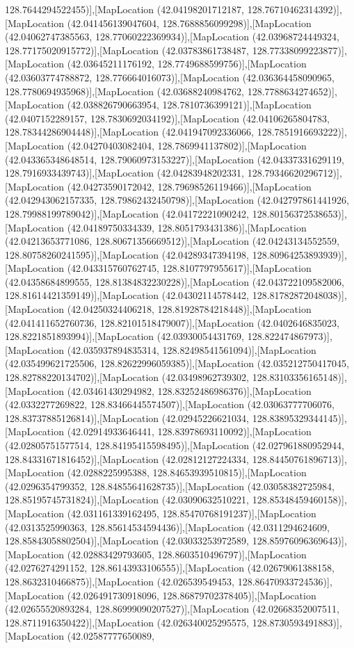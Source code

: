 128.7644294522455)],[MapLocation (42.04198201712187, 128.76710462314392)],[MapLocation (42.041456139047604, 128.7688856099298)],[MapLocation (42.04062747385563, 128.77060222369934)],[MapLocation (42.03968724449324, 128.77175020915772)],[MapLocation (42.03783861738487, 128.77338099223877)],[MapLocation (42.03645211176192, 128.7749688599756)],[MapLocation (42.03603774788872, 128.776664016073)],[MapLocation (42.036364458090965, 128.7780694935968)],[MapLocation (42.03688240984762, 128.7788634274652)],[MapLocation (42.038826790663954, 128.7810736399121)],[MapLocation (42.0407152289157, 128.7830692034192)],[MapLocation (42.04106265804783, 128.78344286904448)],[MapLocation (42.041947092336066, 128.7851916693222)],[MapLocation (42.04270403082404, 128.7869941137802)],[MapLocation (42.043365348648514, 128.79060973153227)],[MapLocation (42.04337331629119, 128.7916933439743)],[MapLocation (42.04283948202331, 128.79346620296712)],[MapLocation (42.04273590172042, 128.79698526119466)],[MapLocation (42.042943062157335, 128.79862432450798)],[MapLocation (42.042797861441926, 128.79988199789042)],[MapLocation (42.04172221090242, 128.80156372538653)],[MapLocation (42.04189750334339, 128.8051793431386)],[MapLocation (42.04213653771086, 128.80671356669512)],[MapLocation (42.04243134552559, 128.80758260241595)],[MapLocation (42.04289347394198, 128.80964253893939)],[MapLocation (42.043315760762745, 128.8107797955617)],[MapLocation (42.04358684899555, 128.81384832230228)],[MapLocation (42.043722109582006, 128.81614421359149)],[MapLocation (42.04302114578442, 128.81782872048038)],[MapLocation (42.04250324406218, 128.81928784218448)],[MapLocation (42.041411652760736, 128.82101518479007)],[MapLocation (42.0402646835023, 128.8221851893994)],[MapLocation (42.03930054431769, 128.822474867973)],[MapLocation (42.035937894835314, 128.82498541561094)],[MapLocation (42.035499621725506, 128.82622996059385)],[MapLocation (42.035212750417045, 128.82788220134702)],[MapLocation (42.03498962739302, 128.83103356165148)],[MapLocation (42.03461430294982, 128.83252486986376)],[MapLocation (42.0332277269822, 128.83466445574507)],[MapLocation (42.03063777706076, 128.83737885126814)],[MapLocation (42.02945226621034, 128.83895329344145)],[MapLocation (42.02914933646441, 128.83978693110092)],[MapLocation (42.02805751577514, 128.84195415598495)],[MapLocation (42.027961880952944, 128.84331671816452)],[MapLocation (42.02812127224334, 128.84450761896713)],[MapLocation (42.0288225995388, 128.84653939510815)],[MapLocation (42.0296354799352, 128.84855641628735)],[MapLocation (42.03058382725984, 128.85195745731824)],[MapLocation (42.03090632510221, 128.85348459460158)],[MapLocation (42.031161339162495, 128.85470768191237)],[MapLocation (42.0313525990363, 128.85614534594436)],[MapLocation (42.0311294624609, 128.85843058802504)],[MapLocation (42.03033253972589, 128.85976096369643)],[MapLocation (42.02883429793605, 128.8603510496797)],[MapLocation (42.0276274291152, 128.86143933106555)],[MapLocation (42.02679061388158, 128.8632310466875)],[MapLocation (42.026539549453, 128.86470933724536)],[MapLocation (42.026491730918096, 128.86879702378405)],[MapLocation (42.02655520893284, 128.86999090207527)],[MapLocation (42.02668352007511, 128.8711916350422)],[MapLocation (42.026340025295575, 128.8730593491883)],[MapLocation (42.02587777650089, 